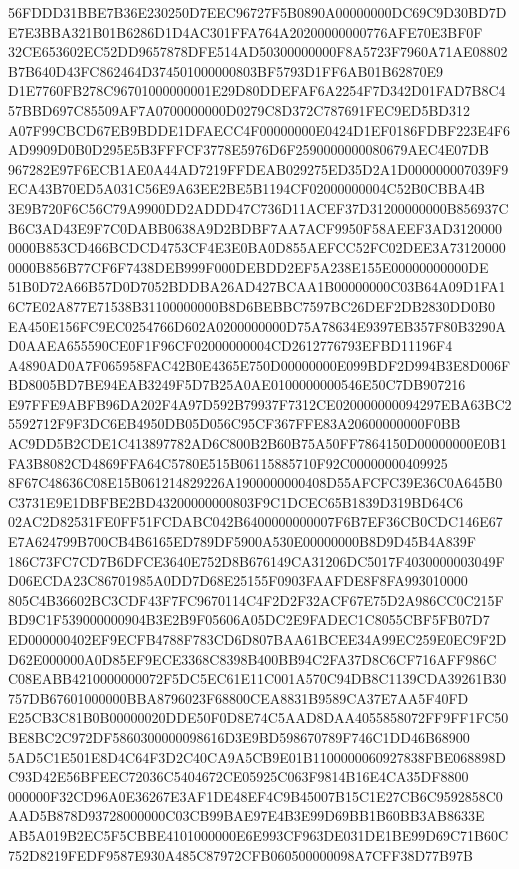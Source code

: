 \documentclass[UTF8,fontset=fandol,zihao=-4,a4paper]{ctexart}
\begin{document}
{{56FDDD31BBE7B36E230250D7EEC96727F5B0890A00000000DC69C9D30BD7DE7E3BBA321B01B6286D1D4AC301FFA764A20200000000776AFE70E3BF0F
32CE653602EC52DD9657878DFE514AD50300000000F8A5723F7960A71AE08802B7B640D43FC862464D374501000000803BF5793D1FF6AB01B62870E9
D1E7760FB278C96701000000001E29D80DDEFAF6A2254F7D342D01FAD7B8C457BBD697C85509AF7A0700000000D0279C8D372C787691FEC9ED5BD312
A07F99CBCD67EB9BDDE1DFAECC4F00000000E0424D1EF0186FDBF223E4F6AD9909D0B0D295E5B3FFFCF3778E5976D6F2590000000080679AEC4E07DB
967282E97F6ECB1AE0A44AD7219FFDEAB029275ED35D2A1D000000007039F9ECA43B70ED5A031C56E9A63EE2BE5B1194CF02000000004C52B0CBBA4B
3E9B720F6C56C79A9900DD2ADDD47C736D11ACEF37D31200000000B856937CB6C3AD43E9F7C0DABB0638A9D2BDBF7AA7ACF9950F58AEEF3AD3120000
0000B853CD466BCDCD4753CF4E3E0BA0D855AEFCC52FC02DEE3A731200000000B856B77CF6F7438DEB999F000DEBDD2EF5A238E155E00000000000DE
51B0D72A66B57D0D7052BDDBA26AD427BCAA1B00000000C03B64A09D1FA16C7E02A877E71538B31100000000B8D6BEBBC7597BC26DEF2DB2830DD0B0
EA450E156FC9EC0254766D602A0200000000D75A78634E9397EB357F80B3290AD0AAEA655590CE0F1F96CF02000000004CD2612776793EFBD11196F4
A4890AD0A7F065958FAC42B0E4365E750D00000000E099BDF2D994B3E8D006FBD8005BD7BE94EAB3249F5D7B25A0AE0100000000546E50C7DB907216
E97FFE9ABFB96DA202F4A97D592B79937F7312CE020000000094297EBA63BC25592712F9F3DC6EB4950DB05D056C95CF367FFE83A20600000000F0BB
AC9DD5B2CDE1C413897782AD6C800B2B60B75A50FF7864150D00000000E0B1FA3B8082CD4869FFA64C5780E515B06115885710F92C00000000409925
8F67C48636C08E15B061214829226A1900000000408D55AFCFC39E36C0A645B0C3731E9E1DBFBE2BD43200000000803F9C1DCEC65B1839D319BD64C6
02AC2D82531FE0FF51FCDABC042B6400000000007F6B7EF36CB0CDC146E67E7A624799B700CB4B6165ED789DF5900A530E00000000B8D9D45B4A839F
186C73FC7CD7B6DFCE3640E752D8B676149CA31206DC5017F4030000003049FD06ECDA23C86701985A0DD7D68E25155F0903FAAFDE8F8FA993010000
805C4B36602BC3CDF43F7FC9670114C4F2D2F32ACF67E75D2A986CC0C215FBD9C1F539000000904B3E2B9F05606A05DC2E9FADEC1C8055CBF5FB07D7
ED000000402EF9ECFB4788F783CD6D807BAA61BCEE34A99EC259E0EC9F2DD62E000000A0D85EF9ECE3368C8398B400BB94C2FA37D8C6CF716AFF986C
C08EABB4210000000072F5DC5EC61E11C001A570C94DB8C1139CDA39261B30757DB67601000000BBA8796023F68800CEA8831B9589CA37E7AA5F40FD
E25CB3C81B0B00000020DDE50F0D8E74C5AAD8DAA4055858072FF9FF1FC50BE8BC2C972DF5860300000098616D3E9BD598670789F746C1DD46B68900
5AD5C1E501E8D4C64F3D2C40CA9A5CB9E01B1100000060927838FBE068898DC93D42E56BFEEC72036C5404672CE05925C063F9814B16E4CA35DF8800
000000F32CD96A0E36267E3AF1DE48EF4C9B45007B15C1E27CB6C9592858C0AAD5B878D93728000000C03CB99BAE97E4B3E99D69BB1B60BB3AB8633E
AB5A019B2EC5F5CBBE4101000000E6E993CF963DE031DE1BE99D69C71B60C752D8219FEDF9587E930A485C87972CFB060500000098A7CFF38D77B97B
}}
\end{document}
